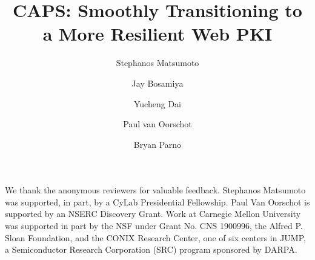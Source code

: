 \documentclass[sigconf]{acmart}
\begin{document}

\title{
  CAPS: Smoothly Transitioning to a More Resilient Web PKI
}

\author{Stephanos Matsumoto}

\author{Jay Bosamiya}

\author{Yucheng Dai}

\author{Paul van Oorschot}

\author{Bryan Parno}

\begin{abstract}
  
\end{abstract}

\maketitle















\begin{acks}
We thank the anonymous reviewers for valuable feedback. Stephanos Matsumoto was
supported, in part, by a CyLab Presidential Fellowship. Paul Van Oorschot is
supported by an NSERC Discovery Grant. Work at Carnegie Mellon University was
supported in part by the NSF under Grant No. CNS 1900996, the Alfred P. Sloan
Foundation, and the CONIX Research Center, one of six centers in JUMP, a
Semiconductor Research Corporation (SRC) program sponsored by DARPA.
\end{acks}




\appendix


\end{document}
